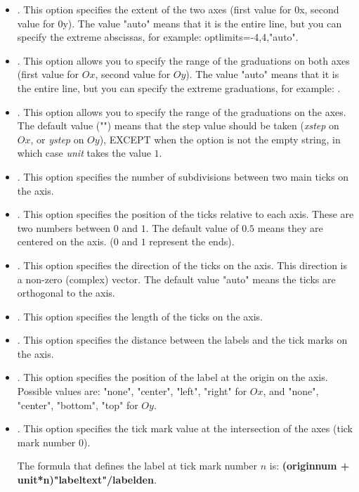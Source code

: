 \begin{itemize}
\begin{itemize}
    \item {}. This option specifies the extent of the two axes (first value for 0x, second value for 0y). The value "auto" means that it is the entire line, but you can specify the extreme abscissas, for example:
opt{limits={{-4,4},"auto"}}.
    \item {}. This option allows you to specify the range of the graduations on both axes (first value for $Ox$, second value for $Oy$). The value "auto" means that it is the entire line, but you can specify the extreme graduations, for example: .
    \item {}. This option allows you to specify the range of the graduations on the axes. The default value ("") means that the step value should be taken (\emph{xstep} on $Ox$, or \emph{ystep} on $Oy$), EXCEPT when the option  is not the empty string, in which case \emph{unit} takes the value $1$.
    \item {}. This option specifies the number of subdivisions between two main ticks on the axis.
    \item {}. This option specifies the position of the ticks relative to each axis. These are two numbers between $0$ and $1$. The default value of $0.5$ means they are centered on the axis. ($0$ and $1$ represent the ends).
    \item {}. This option specifies the direction of the ticks on the axis. This direction is a non-zero (complex) vector. The default value "auto" means the ticks are orthogonal to the axis.
    \item {}. This option specifies the length of the ticks on the axis.
    \item {}. This option specifies the distance between the labels and the tick marks on the axis.
    \item {}. This option specifies the position of the label at the origin on the axis. Possible values ​​are: "none", "center", "left", "right" for $Ox$, and "none", "center", "bottom", "top" for $Oy$.
    \item {}. This option specifies the tick mark value at the intersection of the axes (tick mark number $0$).

The formula that defines the label at tick mark number $n$ is: \textbf{(originnum + unit*n)"labeltext"/labelden}.


\end{itemize}
\end{itemize}
